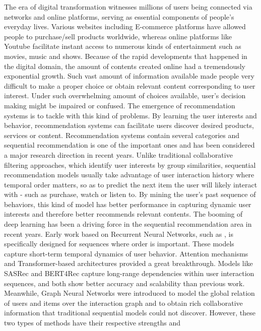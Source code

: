 \documentclass[12pt,a4paper]{report}
\begin{document}
The era of digital transformation witnesses millions of users being connected
via networks and online platforms, serving as essential components of people's
everyday lives. Various websites including E-commerce platforms have allowed
people to purchase/sell products worldwide, whereas online platforms like
Youtube facilitate instant access to numerous kinds of entertainment such as
movies, music and shows.
Because of the rapid developments that happened in the digital domain, the
amount of contents created online had a tremendously exponential growth. Such
vast amount of information available made people very difficult to make a
proper choice or obtain relevant content corresponding to user interest. Under
such overwhelming amount of choices available, user's decision making might be
impaired or confused.
The emergence of recommendation systems is to tackle with this kind of
problems. By learning the user interests and behavior, recommendation systems
can facilitate users discover desired products, services or content.
Recommendation systems contain several categories and sequential recommendation
is one of the important ones and has been considered a major research direction
in recent years. Unlike traditional collaborative filtering approaches, which
identify user interests by group similarities, sequential recommendation models
usually take advantage of user interaction history where temporal order matters,
so as to predict the next item the user will likely interact with - such as
purchase, watch or listen to. By mining the user's past sequence of behaviors,
this kind of model has better performance in capturing dynamic user interests
and therefore better recommends relevant contents.
The booming of deep learning has been a driving force in the sequential
recommendation area in recent years. Early work based on Recurrent Neural
Networks, such as \citet{hidasi2016gru4rec}, is specifically designed for
sequences where order is important. These models capture short-term temporal
dynamics of user behavior.
Attention mechanisms and Transformer-based architectures provided a great
breakthrough. Models like SASRec \citep{kang2018sasrec} and BERT4Rec
\citep{sun2019bert4rec} capture long-range dependencies within user interaction
sequences, and both show better accuracy and scalability than previous work.
Meanwhile, Graph Neural Networks were introduced to model the global relation
of users and items over the interaction graph and to obtain rich collaborative
information that traditional sequential models could not discover.
However, these two types of methods have their respective strengths and
\end{document}
